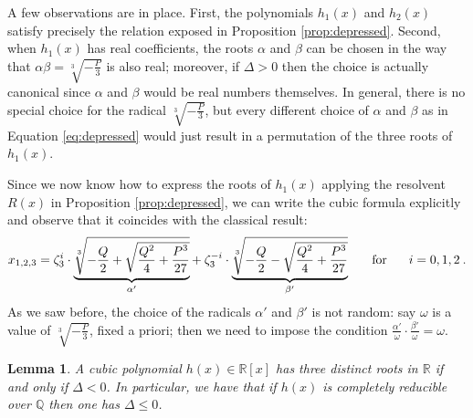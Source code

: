 \documentclass[11pt,a4paper]{article}
\numberwithin{equation}{section}
\renewcommand{\leq}{\leqslant}
\newcommand{\R}{\mathbb{R}}
\newcommand{\Q}{\mathbb{Q}}
\newtheorem{lemma}[teo]{Lemma}
\theoremstyle{definition}
\begin{document}
A few observations are in place. First, the polynomials $h_1(x)$ and $h_2(x)$ satisfy precisely the relation exposed in Proposition \ref{prop:depressed}. Second, when $h_1(x)$ has real coefficients, the roots $\alpha$ and $\beta$ can be chosen in the way that $\alpha\beta=\sqrt[3]{-\frac{P}{3}}$ is also real; moreover, if $\Delta>0$ then the choice is actually canonical since $\alpha$ and $\beta$ would be real numbers themselves. In general, there is no special choice for the radical $\sqrt[3]{-\frac{P}{3}}$, but every different choice of $\alpha$ and $\beta$ as in Equation \eqref{eq:depressed} would just result in a permutation of the three roots of $h_1(x)$.

Since we now know how to express the roots of $h_1(x)$ applying the resolvent $R(x)$ in Proposition \ref{prop:depressed}, we can write the cubic formula explicitly and observe that it coincides with the classical result:
\[x_{1,2,3}=\zeta_3^i\cdot\underbrace{\sqrt[3]{-\dfrac{Q}{2}+\sqrt{\dfrac{Q^2}{4}+\dfrac{P^3}{27}}}}_{\alpha'}+\:\zeta_3^{-i}\cdot\underbrace{\sqrt[3]{-\dfrac{Q}{2}-\sqrt{\dfrac{Q^2}{4}+\dfrac{P^3}{27}}}}_{\beta'}\hspace{0.5cm}\text{ for }\hspace{0.5cm}i=0,1,2\:.\]
As we saw before, the choice of the radicals $\alpha'$ and $\beta'$ is not random: say $\omega$ is a value of $\sqrt[3]{-\frac{P}{3}}$, fixed a priori; then we need to impose the condition $\frac{\alpha'}{\omega}\cdot\frac{\beta'}{\omega}=\omega$.   
\begin{lemma}
 \label{lemma:negative}
 A cubic polynomial $h(x)\in\R[x]$ has three distinct roots in $\R$ if and only if $\Delta<0$. In particular, we have that if $h(x)$ is completely reducible over $\Q$ then one has $\Delta\leq0$.  
\end{lemma}
\end{document}

